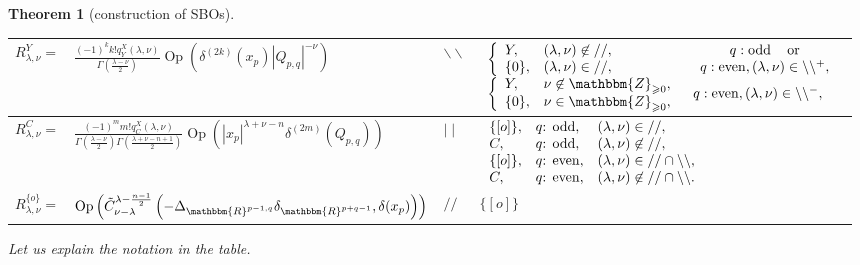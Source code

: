 \documentclass[12pt]{article} %
\newcommand{\assign}{:=}
\newcommand{\nin}{\not\in}
\newcommand{\tmop}[1]{\ensuremath{\operatorname{#1}}}
\newtheorem{theorem}{Theorem}
\theoremstyle{definition}
\theoremstyle{exampstyle} \newtheorem{examp}[theorem]{Theorem}
\renewcommand{\Q}{Q_{p,q}}
\newcommand{\teven}{\mbox{\textrm{: even}}}
\newcommand{\todd}{\mbox{\textrm{: odd}}}
\begin{document}
\begin{theorem}[construction of SBOs]
\begin{tabular}{@{}|@{}l@{}|@{}l@{}|l@{}|@{}l@{}|}
  \hline
  $R_{\lambda, \nu}^Y =$ & $\frac{(-1)^k k! q_Y^X (\lambda, \nu)}{\Gamma \left( \frac{\lambda - \nu}{2}
  \right) }{\tmop{Op} \left( \delta^{(2k)}(x_p)
  | \Q |^{- \nu}  \right)}$ & $
  \backslash\backslash$ & {
$ \begin{array}{ll}
  \left\{ \begin{array}{ll}
    Y, & (\lambda, \nu) \nin / /,\\
    \{ 0 \}, & (\lambda, \nu) \in / /,
  \end{array} \right. & \begin{array}{c}
    q : \tmop{odd} \quad \tmop{or}\\
    q : \tmop{even}, (\lambda, \nu) \in \backslash\backslash^+,
  \end{array}\\
  \left\{ \begin{array}{ll}
    Y, & \nu \nin \mathbbm{Z}_{\geqslant 0},\\
    \{ 0 \}, & \nu \in \mathbbm{Z}_{\geqslant 0},
  \end{array} \right. & q : \tmop{even}, (\lambda, \nu) \in
  \backslash\backslash^-,
\end{array} $
  }\\
  \hline
  $R_{\lambda, \nu}^C =$ & $\frac{(-1)^m m! q_C^X (\lambda, \nu)}{\Gamma \left( \frac{\lambda - \nu}{2}
  \right) \Gamma \left( \frac{\lambda + \nu - n + 1}{2} \right) }{\tmop{Op} \left( | x_p |^{\lambda + \nu - n}\delta^{(2m)}\left( \Q \right)
    \right)}$ & $ \mid \mid$ &
  $\left. \begin{array}{lll}
	  \{ [o] \}, &q\todd, & (\lambda, \nu) \in / /,\\
    C, & q\todd, & (\lambda, \nu) \nin / /,\\
    \{ [o] \}, & q\teven , & (\lambda, \nu) \in / / \cap
    \backslash\backslash,\\
    C, & q\teven, & (\lambda, \nu) \nin / / \cap
    \backslash\backslash.
  \end{array} \right.$\\
  \hline
  $R_{\lambda, \nu}^{\{ o \}} =$ & 
  $\tmop{Op} \left( \tilde{C}_{\nu -
  \lambda}^{\lambda - \frac{n - 1}{2}} \left(-\Delta_{\mathbbm{R}^{p - 1, q}}
  \delta_{\mathbbm{R}^{p + q - 1}}, \delta (x_p)\right) \right)
  $ & $
  / /$ & $\{ [o] \}$\\
  \hline
\end{tabular}
Let us explain the notation in the table.
\end{theorem}
\end{document}
